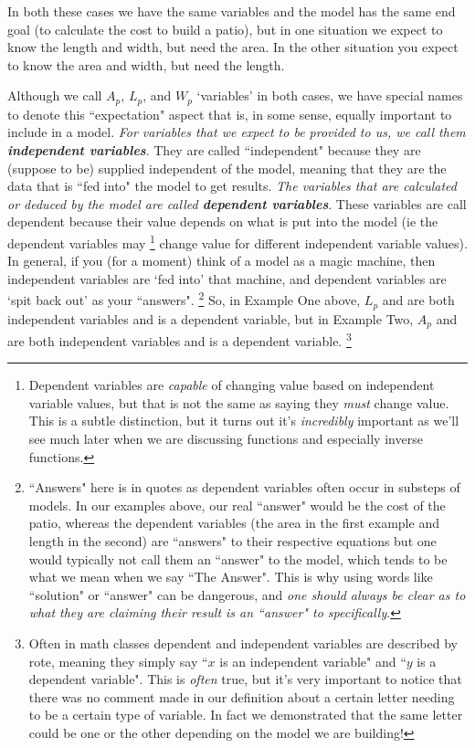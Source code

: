 \documentclass{ximera}
\begin{document}
    In both these cases we have the same variables and the model has the same end goal (to calculate the cost to build a patio), but in one situation we expect to know the length and width, but need the area. In the other situation you expect to know the area and width, but need the length.
    
    \begin{exploration}
        Although we call $A_p$, $L_p$, and $W_p$ `variables' in both cases, we have special names to denote this ``expectation" aspect that is, in some sense, equally important to include in a model. \textit{For variables that we expect to be provided to us, we call them \textbf{independent variables}}. They are called ``independent" because they are (suppose to be) supplied independent of the model, meaning that they are the data that is ``fed into" the model to get results. \textit{The variables that are calculated or deduced by the model are called \textbf{dependent variables}}. These variables are call dependent because their value depends on what is put into the model (ie the dependent variables may%
        \footnote{Dependent variables are \textit{capable} of changing value based on independent variable values, but that is not the same as saying they \textit{must} change value. This is a subtle distinction, but it turns out it's \textit{incredibly} important as we'll see much later when we are discussing functions and especially inverse functions.}
        change value for different independent variable values). In general, if you (for a moment) think of a model as a magic machine, then independent variables are `fed into' that machine, and dependent variables are `spit back out' as your ``answers".%
        \footnote{``Answers" here is in quotes as dependent variables often occur in substeps of models. In our examples above, our real ``answer" would be the cost of the patio, whereas the dependent variables (the area in the first example and length in the second) are ``answers" to their respective equations but one would typically not call them an ``answer" to the model, which tends to be what we mean when we say ``The Answer". This is why using words like ``solution" or ``answer" can be dangerous, and \textit{one should always be clear as to what they are claiming their result is an ``answer" to specifically}.}
        So, in Example One above, $L_p$ and  are both independent variables and  is a dependent variable, but in Example Two, $A_p$ and are both independent variables and  is a dependent variable.%
        \footnote{Often in math classes dependent and independent variables are described by rote, meaning they simply say ``$x$ is an independent variable" and ``$y$ is a dependent variable". This is \textit{often} true, but it's very important to notice that there was no comment made in our definition about a certain letter needing to be a certain type of variable. In fact we demonstrated that the same letter could be one or the other depending on the model we are building!}
    \end{exploration}
    
\end{document}
